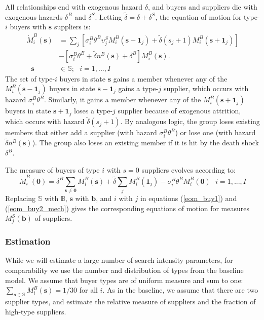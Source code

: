 \documentclass[12pt]{article} \usepackage{amsmath,amssymb,amsthm,geometry,graphicx,setspace,algorithm,algpseudocode,float}
\begin{document}
All relationships end with exogenous hazard $\delta$, and buyers and suppliers die with exogenous hazards $\delta^B$ and $\delta^S$.  Letting $\tilde{\delta} = \delta + \delta^S$, the equation of motion for type-$i$ buyers with $\mathbf{s}$ suppliers is:
\begin{align}
\dot{M}_{i}^{B}(\mathbf{s}) & =\sum_{j}\left[\sigma_{i}^{B}\theta^{B}\upsilon_{j}^{S}M_{i}^{B}(\mathbf{s}-\mathbf{1}_{j})+\tilde{\delta}(s_{j}+1)M_{i}^{B}(\mathbf{s}+\mathbf{1}_{j})\right]\label{eom_buy1}\\
 & -\left[\sigma_{i}^{B}\theta^{B}+\tilde{\delta} n^{B}(\mathbf{s}) + \delta^B \right]M_{i}^{B}(\mathbf{s}).\nonumber \\
\text{ \ \ \ \ \ \ \ \ \ \ \ \ \ \ }\mathbf{s} & \in\mathbb{S};\text{ }i=1,...,I\nonumber 
\end{align}
The set of type-$i$ buyers in state $\mathbf{s}$ gains
a member whenever any of the $M_{i}^{B}(\mathbf{s}-\mathbf{1}_{j})$
buyers in state $\mathbf{s}-\mathbf{1}_{j}$ gains a type-$j$ supplier,
which occurs with hazard $\sigma_{i}^{B}\theta^{B}.$ Similarly, it
gains a member whenever any of the $M_{i}^{B}(\mathbf{s}+\mathbf{1}_{j})$
buyers in state $\mathbf{s}+\mathbf{1}_{j}$ loses a type-$j$ supplier
because of exogenous attrition, which occurs with hazard $\tilde{\delta}(s_{j}+1).$
By analogous logic, the group loses existing members that either add
a supplier (with hazard $\sigma_{i}^{B}\theta^{B}$) or lose one (with
hazard $\tilde{\delta} n^{B}(\mathbf{s})$).  The group also loses an existing member
if it is hit by the death shock $\delta^B$. 

The measure of buyers of type $i$ with $s=0$ suppliers evolves according
to:
\begin{equation}
\dot{M}_{i}^{B}(\mathbf{0})=\delta^B\sum_{\mathbf{s}\neq \mathbf{0}}M_i^B(\mathbf{s}) + \tilde{\delta}\sum_{j}M_{i}^{B}(\mathbf{1}_{j})-\sigma_{i}^{B}\theta^{B}M_{i}^{B}(\mathbf{0})\text{ \ \ }i=1,...,I\label{eom_buy2_mech}
\end{equation}
Replacing $\mathbb{S}$ with $\mathbb{B}$, $\mathbf{s}$ with $\mathbf{b}$,
and $i$ with $j$ in equations (\ref{eom_buy1}) and (\ref{eom_buy2_mech})
gives the corresponding equations of motion for measures $M_{j}^{S}(\mathbf{b})$
of suppliers.

\subsubsection{Estimation}

While we will estimate a large number of search intensity parameters, for comparability we use the number and distribution of types from the baseline model.  We assume that buyer types are of uniform measure and sum to one: $\sum_{\boldsymbol{s}\in\mathbb{S}}M_{i}^{B}(\mathbf{s})=1/30$
for all $i$.  As in the baseline, we assume that there are two supplier types, and estimate the relative measure of suppliers and the fraction of high-type suppliers. 
\end{document}
